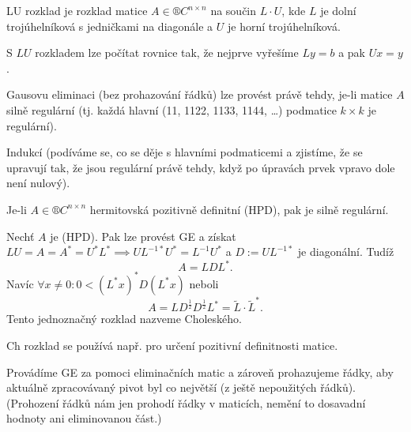 \documentclass[12pt]{article}					%
\begin{document}
\begin{definice}[LU rozklad]
	LU rozklad je rozklad matice $A \in ®C^{n \times n}$ na součin $L·U$, kde $L$ je dolní trojúhelníková s jedničkami na diagonále a $U$ je horní trojúhelníková.
\end{definice}

\begin{poznamka}
	S $LU$ rozkladem lze počítat rovnice tak, že nejprve vyřešíme $Ly = b$ a pak $Ux = y$.
\end{poznamka}

\begin{veta}[O proveditelnosti GE]
	Gausovu eliminaci (bez prohazování řádků) lze provést právě tehdy, je-li matice $A$ silně regulární (tj. každá hlavní (11, 1122, 1133, 1144, …) podmatice $k \times k$ je regulární).

	\begin{dukazin}
		Indukcí (podíváme se, co se děje s hlavními podmaticemi a zjistíme, že se upravují tak, že jsou regulární právě tehdy, když po úpravách prvek vpravo dole není nulový).
	\end{dukazin}
\end{veta}

\begin{lemma}
	Je-li $A \in ®C^{n \times n}$ hermitovská pozitivně definitní (HPD), pak je silně regulární.
\end{lemma}

\begin{definice}
	Nechť $A$ je (HPD). Pak lze provést GE a získat $LU = A = A^* = U^*L^* \implies UL^{-1*}U^* = L^{-1}U^*$ a $D := UL^{-1*}$ je diagonální. Tudíž
	$$ A = LDL^*. $$
	Navíc $\forall x ≠ 0: 0 < (L^*x)^* D(L^*x)$ neboli
	$$ A = LD^{\frac{1}{2}}D^{\frac{1}{2}}L^* = \tilde L· \tilde L^*. $$
	Tento jednoznačný rozklad nazveme Choleského.
\end{definice}

\begin{poznamka}
	Ch rozklad se používá např. pro určení pozitivní definitnosti matice.
\end{poznamka}

\begin{definice}
	Provádíme GE za pomoci eliminačních matic a zároveň prohazujeme řádky, aby aktuálně zpracovávaný pivot byl co největší (z ještě nepoužitých řádků). (Prohození řádků nám jen prohodí řádky v maticích, nemění to dosavadní hodnoty ani eliminovanou část.)
\end{definice}
\end{document}
